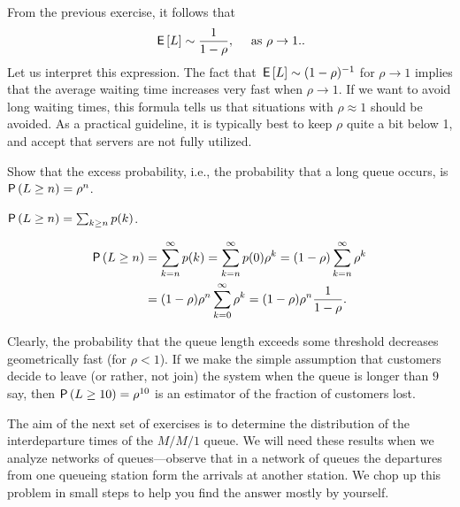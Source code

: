 From the previous exercise, it follows that
\begin{equation*}
 \,\mathsf{E}\left[L\right] \sim \frac 1{1-\rho}, \quad \text{ as }\rho\to 1..
\end{equation*}
Let us interpret this expression. The fact
that $\,\mathsf{E}\left[L\right] \sim (1-\rho)^{-1}$ for $\rho\to 1$ implies that the
average waiting time increases very fast when $\rho\to1$.  If we want to avoid  long waiting times, this formula tells us that  situations with
$\rho\approx 1$ should be avoided. As a practical guideline, it is typically best to  keep $\rho$ quite a bit below 1, and accept that servers are not fully  utilized. 


\begin{exercise}
  Show that the excess probability, i.e., the probability that a long queue occurs, is 
$\P{L\geq n} = \rho^n$.
  \begin{hint}
$\P{L\geq n} = \sum_{k\geq n} p(k)$.
  \end{hint}
  \begin{solution}
    \begin{equation*}
      \begin{split}
 \P{L\geq n} 
 &= \sum_{k=n}^\infty p(k) = \sum_{k=n}^\infty p(0)\rho^k = (1-\rho)\sum_{k=n}^\infty \rho^k \\
 &= (1-\rho)\rho^n \sum_{k=0}^\infty\rho^k = (1-\rho) \rho^n \frac1{1-\rho}.
\end{split}
\end{equation*}
\end{solution}
\end{exercise}

Clearly,  the probability that the queue length exceeds some threshold decreases geometrically fast (for  $\rho<1$). If we make the simple assumption
that customers decide to leave (or rather, not join) the system when
the queue is longer than $9$ say, then $\P{L\geq 10} = \rho^{10}$ is
an estimator of the fraction of customers lost. 




The aim of the next set of exercises is to determine the distribution of the
interdeparture times of the $M/M/1$ queue.  We will need these results when we analyze networks of queues---observe that in a network of queues the departures from one queueing station form the arrivals at another station. We chop up this problem in small steps to help you find the answer mostly by yourself. 



